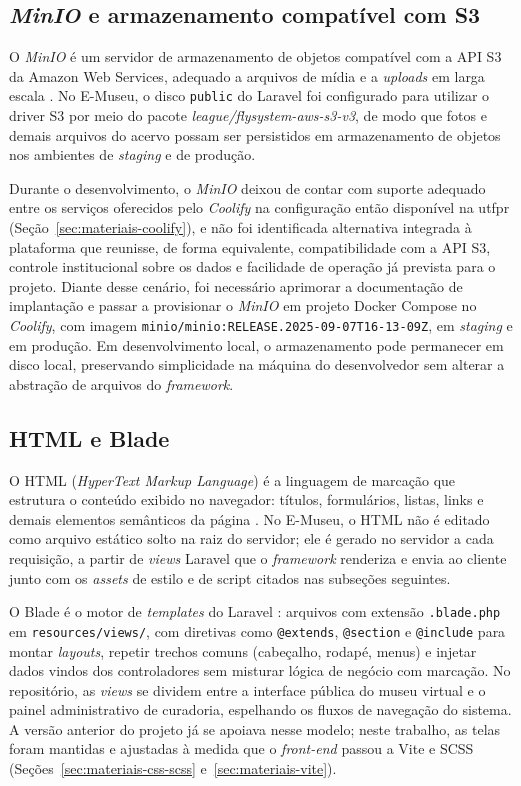 \subsection{\textit{MinIO} e armazenamento compatível com S3}

O \textit{MinIO} é um servidor de armazenamento de objetos compatível com a API S3 da Amazon Web Services, adequado a arquivos de mídia e a \textit{uploads} em larga escala \cite{minio}. No E-Museu, o disco \texttt{public} do Laravel foi configurado para utilizar o driver S3 por meio do pacote \textit{league/flysystem-aws-s3-v3}, de modo que fotos e demais arquivos do acervo possam ser persistidos em armazenamento de objetos nos ambientes de \textit{staging} e de produção.

Durante o desenvolvimento, o \textit{MinIO} deixou de contar com suporte adequado entre os serviços oferecidos pelo \textit{Coolify} na configuração então disponível na \acrshort{utfpr} (Seção~\ref{sec:materiais-coolify}), e não foi identificada alternativa integrada à plataforma que reunisse, de forma equivalente, compatibilidade com a API S3, controle institucional sobre os dados e facilidade de operação já prevista para o projeto. Diante desse cenário, foi necessário aprimorar a documentação de implantação e passar a provisionar o \textit{MinIO} em projeto Docker Compose no \textit{Coolify}, com imagem \texttt{minio/minio:RELEASE.2025-09-07T16-13-09Z}, em \textit{staging} e em produção. Em desenvolvimento local, o armazenamento pode permanecer em disco local, preservando simplicidade na máquina do desenvolvedor sem alterar a abstração de arquivos do \textit{framework}.


\subsection{HTML e Blade}\label{sec:materiais-html-blade}

O HTML (\textit{HyperText Markup Language}) é a linguagem de marcação que estrutura o conteúdo exibido no navegador: títulos, formulários, listas, links e demais elementos semânticos da página \cite{html}. No E-Museu, o HTML não é editado como arquivo estático solto na raiz do servidor; ele é gerado no servidor a cada requisição, a partir de \textit{views} Laravel que o \textit{framework} renderiza e envia ao cliente junto com os \textit{assets} de estilo e de script citados nas subseções seguintes.

O Blade é o motor de \textit{templates} do Laravel \cite{laravel}: arquivos com extensão \texttt{.blade.php} em \texttt{resources/views/}, com diretivas como \texttt{@extends}, \texttt{@section} e \texttt{@include} para montar \textit{layouts}, repetir trechos comuns (cabeçalho, rodapé, menus) e injetar dados vindos dos controladores sem misturar lógica de negócio com marcação. No repositório, as \textit{views} se dividem entre a interface pública do museu virtual e o painel administrativo de curadoria, espelhando os fluxos de navegação do sistema. A versão anterior do projeto já se apoiava nesse modelo; neste trabalho, as telas foram mantidas e ajustadas à medida que o \textit{front-end} passou a Vite e SCSS (Seções~\ref{sec:materiais-css-scss} e~\ref{sec:materiais-vite}).


